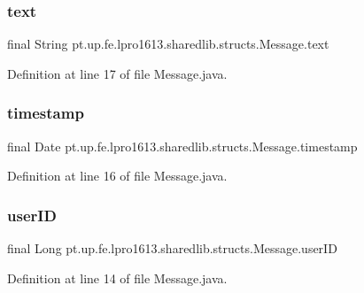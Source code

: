 \subsubsection{\texorpdfstring{text}{text}}
{\footnotesize\ttfamily final String pt.\+up.\+fe.\+lpro1613.\+sharedlib.\+structs.\+Message.\+text}



Definition at line 17 of file Message.\+java.

\hypertarget{classpt_1_1up_1_1fe_1_1lpro1613_1_1sharedlib_1_1structs_1_1_message_ab239d2ff2fc6896df1b006a4e61d2606}{}\label{classpt_1_1up_1_1fe_1_1lpro1613_1_1sharedlib_1_1structs_1_1_message_ab239d2ff2fc6896df1b006a4e61d2606} 
\subsubsection{\texorpdfstring{timestamp}{timestamp}}
{\footnotesize\ttfamily final Date pt.\+up.\+fe.\+lpro1613.\+sharedlib.\+structs.\+Message.\+timestamp}



Definition at line 16 of file Message.\+java.

\hypertarget{classpt_1_1up_1_1fe_1_1lpro1613_1_1sharedlib_1_1structs_1_1_message_a1d8ccfc6ffc283441cd73b8a915a9ac6}{}\label{classpt_1_1up_1_1fe_1_1lpro1613_1_1sharedlib_1_1structs_1_1_message_a1d8ccfc6ffc283441cd73b8a915a9ac6} 
\subsubsection{\texorpdfstring{user\+ID}{userID}}
{\footnotesize\ttfamily final Long pt.\+up.\+fe.\+lpro1613.\+sharedlib.\+structs.\+Message.\+user\+ID}



Definition at line 14 of file Message.\+java.

\hypertarget{classpt_1_1up_1_1fe_1_1lpro1613_1_1sharedlib_1_1structs_1_1_message_a3c1e06e2767c238a3f508d5c3857f9a2}{}\label{classpt_1_1up_1_1fe_1_1lpro1613_1_1sharedlib_1_1structs_1_1_message_a3c1e06e2767c238a3f508d5c3857f9a2} 
